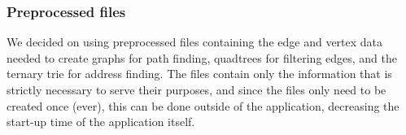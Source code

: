 \subsubsection{Preprocessed files}
We decided on using preprocessed files containing the edge and vertex data needed to create graphs for path finding, quadtrees for filtering edges, and the ternary trie for address finding. The files contain only the information that is strictly necessary to serve their purposes, and since the files only need to be created once (ever), this can be done outside of the application, decreasing the start-up time of the application itself.
